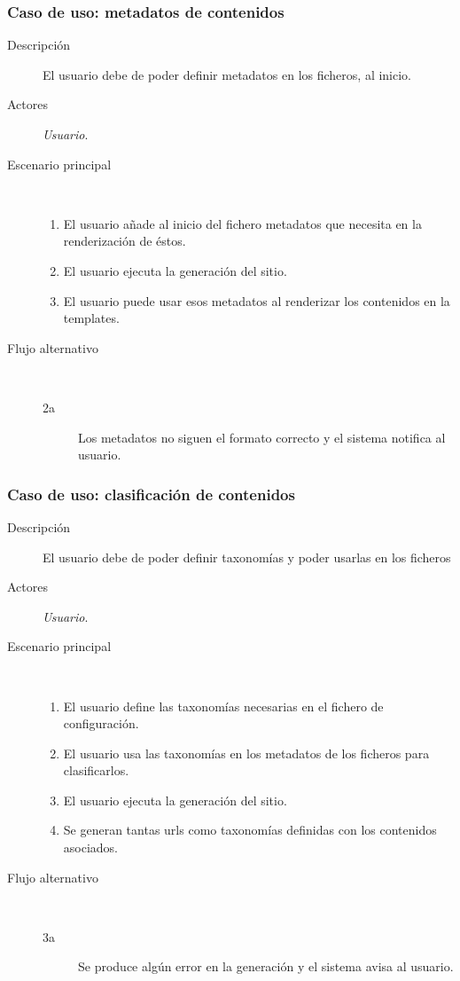 \subsubsection{Caso de uso: metadatos de contenidos}

\begin{description}
    \item[Descripción] El usuario debe de poder definir metadatos en los ficheros, al inicio.
    \item[Actores] \textit{Usuario}.
    \item[Escenario principal] $\quad$
        \begin{enumerate}
            \item El usuario añade al inicio del fichero metadatos que necesita en la renderización de éstos.
            \item El usuario ejecuta la generación del sitio.
            \item El usuario puede usar esos metadatos al renderizar los contenidos en la templates.
        \end{enumerate}
    \item[Flujo alternativo] $\quad$
        \begin{description}
            \item[2a] Los metadatos no siguen el formato correcto y el sistema notifica al usuario.
        \end{description}
\end{description}

\subsubsection{Caso de uso: clasificación de contenidos}

\begin{description}
    \item[Descripción] El usuario debe de poder definir taxonomías y poder usarlas en los ficheros
    \item[Actores] \textit{Usuario}.
    \item[Escenario principal] $\quad$
        \begin{enumerate}
            \item El usuario define las taxonomías necesarias en el fichero de configuración.
            \item El usuario usa las taxonomías en los metadatos de los ficheros para clasificarlos.
            \item El usuario ejecuta la generación del sitio.
            \item Se generan tantas urls como taxonomías definidas con los contenidos asociados.
        \end{enumerate}
    \item[Flujo alternativo] $\quad$
        \begin{description}
            \item[3a] Se produce algún error en la generación y el sistema avisa al usuario.
        \end{description}
\end{description}

